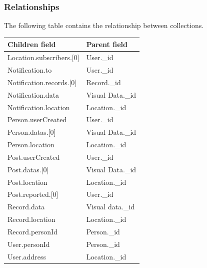 \subsubsection{Relationships}
The following table contains the relationship between collections.
\begin{table}[H]
	\begin{tabular}{|l|l|}
		\hline
		\textbf{Children field}                             & \textbf{Parent field} \\ \hline
		Location.subscribers.{[}0{]}                        & User.\_id             \\ \hline
		Notification.to                                     & User.\_id             \\ \hline
		Notification.records.{[}0{]}                        & Record.\_id           \\ \hline
		Notification.data                                   & Visual Data.\_id      \\ \hline
		Notification.location                               & Location.\_id         \\ \hline
		Person.userCreated                                  & User.\_id             \\ \hline
		Person.datas.{[}0{]}                                & Visual Data.\_id      \\ \hline
		Person.location                                     & Location.\_id         \\ \hline
		Post.userCreated                                    & User.\_id             \\ \hline
		Post.datas.{[}0{]}                                  & Visual Data.\_id      \\ \hline
		Post.location                                       & Location.\_id         \\ \hline
		Post.reported.{[}0{]}                               & User.\_id             \\ \hline
		Record.data                                         & Visual data.\_id      \\ \hline
		Record.location                                     & Location.\_id         \\ \hline
		Record.personId                                     & Person.\_id           \\ \hline
		User.personId                                       & Person.\_id           \\ \hline
		User.address                                        & Location.\_id         \\ \hline

\end{tabular}
\end{table}
